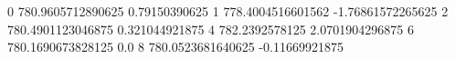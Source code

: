 0 780.9605712890625 0.79150390625
1 778.4004516601562 -1.76861572265625
2 780.4901123046875 0.321044921875
4 782.2392578125 2.0701904296875
6 780.1690673828125 0.0
8 780.0523681640625 -0.11669921875
